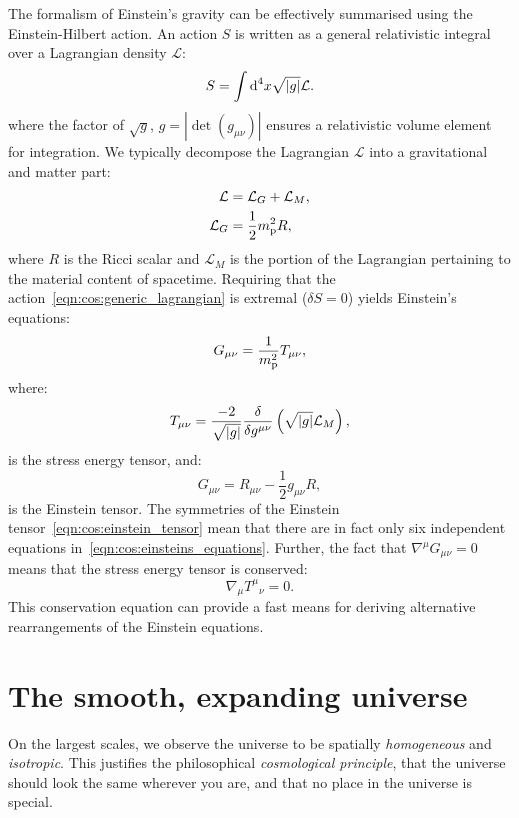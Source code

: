 The formalism of Einstein's gravity can be effectively summarised using the Einstein-Hilbert action. An action \(S\) is written as a general relativistic integral over a Lagrangian density \(\mathcal{L}\):
\begin{equation}
  S = \int\d[4]{x} \sqrt{|g|} \mathcal{L}.
  \label{eqn:cos:generic_lagrangian}
\end{equation}
where the factor of \(\sqrt{g}\), \(g=\left|\det\left( g_{\mu\nu} \right)\right|\) ensures a relativistic volume element for integration.
We typically decompose the Lagrangian \(\mathcal{L}\) into a gravitational and matter part:
\begin{align}
  \mathcal{L} &= \mathcal{L}_G + \mathcal{L}_M,
  \label{eqn:cos:decomp}\\
  \mathcal{L}_G &= \frac{1}{2} \m^2 R,
  \label{eqn:cos:L_grav}
\end{align}
where \(R\) is the Ricci scalar and \(\mathcal{L}_M\) is the portion of the Lagrangian pertaining to the material content of spacetime. Requiring that the action~\eqref{eqn:cos:generic_lagrangian} is extremal (\(\delta S = 0\)) yields Einstein's equations:
\begin{equation}
  G_{\mu\nu} = \frac{1}{\m^2}T_{\mu\nu},
  \label{eqn:cos:einsteins_equations}
\end{equation}
where:
\begin{equation}
  T_{\mu\nu} = \frac{-2}{\sqrt{\abs{g}}}\frac{\delta}{\delta g^{\mu\nu}}\left( \sqrt{\abs{g}} \mathcal{L}_M \right),
  \label{eqn:cos:SET_fundamantal}
\end{equation}
is the stress energy tensor, and:
\begin{equation}
  G_{\mu\nu} = R_{\mu\nu} - \frac{1}{2}g_{\mu\nu} R,
  \label{eqn:cos:einstein_tensor}
\end{equation}
is the Einstein tensor. The symmetries of the Einstein tensor~\eqref{eqn:cos:einstein_tensor} mean that there are in fact only six independent equations in~\eqref{eqn:cos:einsteins_equations}. Further, the fact that \(\nabla^\mu G_{\mu\nu}=0\) means that the stress energy tensor is conserved:
\begin{equation}
  \nabla_\mu {T^{\mu}}_{\nu} = 0.
  \label{eqn:cos:SET_conservation}
\end{equation}
This conservation equation can provide a fast means for deriving alternative rearrangements of the Einstein equations.

\section{The smooth, expanding universe}
On the largest scales, we observe the universe to be spatially {\em homogeneous\/} and {\em isotropic}. This justifies the philosophical {\em cosmological principle}, that the universe should look the same wherever you are, and that no place in the universe is special. 

